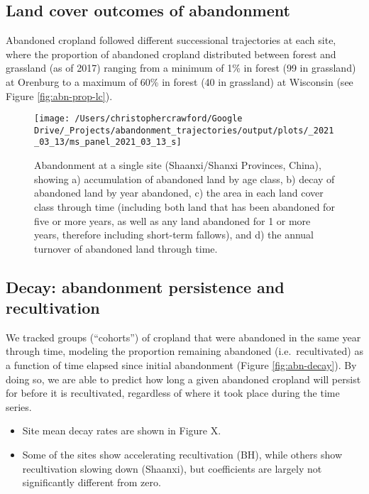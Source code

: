 \documentclass[
]{article}
\providecommand{\tightlist}{%
  \setlength{\itemsep}{0pt}\setlength{\parskip}{0pt}}
\begin{document}
\hypertarget{land-cover-outcomes-of-abandonment}{%
\subsection{Land cover outcomes of abandonment}\label{land-cover-outcomes-of-abandonment}}

Abandoned cropland followed different successional trajectories at each site, where the proportion of abandoned cropland distributed between forest and grassland (as of 2017) ranging from a minimum of 1\% in forest (99 in grassland) at Orenburg to a maximum of 60\% in forest (40 in grassland) at Wisconsin (see Figure \ref{fig:abn-prop-lc}).



\begin{figure}
\texttt{[image: /Users/christophercrawford/Google Drive/\_Projects/abandonment\_trajectories/output/plots/\_2021\_03\_13/ms\_panel\_2021\_03\_13\_s]} \caption{Abandonment at a single site (Shaanxi/Shanxi Provinces, China), showing a) accumulation of abandoned land by age class, b) decay of abandoned land by year abandoned, c) the area in each land cover class through time (including both land that has been abandoned for five or more years, as well as any land abandoned for 1 or more years, therefore including short-term fallows), and d) the annual turnover of abandoned land through time.}\label{fig:abn-panel-s}
\end{figure}

\hypertarget{decay-abandonment-persistence-and-recultivation}{%
\subsection{Decay: abandonment persistence and recultivation}\label{decay-abandonment-persistence-and-recultivation}}

We tracked groups (``cohorts'') of cropland that were abandoned in the same year through time, modeling the proportion remaining abandoned (i.e.~recultivated) as a function of time elapsed since initial abandonment (Figure \ref{fig:abn-decay}).
By doing so, we are able to predict how long a given abandoned cropland will persist for before it is recultivated, regardless of where it took place during the time series.

\begin{itemize}
\tightlist
\item
  Site mean decay rates are shown in Figure X.
\item
  Some of the sites show accelerating recultivation (BH), while others show recultivation slowing down (Shaanxi), but coefficients are largely not significantly different from zero.
\end{itemize}
\end{document}
